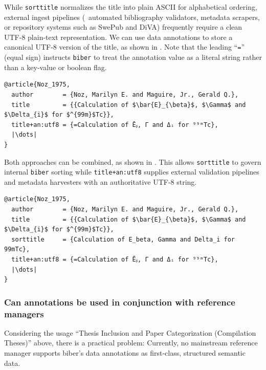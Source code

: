 \documentclass[12pt, twoside]{article}
\begin{document}
While \texttt{sorttitle} normalizes the title into plain ASCII for alphabetical ordering, external ingest pipelines (\eg\ automated bibliography validators, metadata scrapers, or repository systems such as SwePub and \gls{DiVA}) frequently require a clean UTF-8 plain-text representation. We can use \BibLaTeX{} data annotations to store a canonical UTF-8 version of the title, as shown in . Note that the leading \enquote{\texttt{=}} (equal sign) instructs \texttt{biber} to treat the annotation value as a literal string rather than a key-value or boolean flag.

\begin{listing}[!ht]
\begin{verbatim}
@article{Noz_1975,
  author        = {Noz, Marilyn E. and Maguire, Jr., Gerald Q.},
  title         = {{Calculation of $\bar{E}_{\beta}$, $\Gamma$ and $\Delta_{i}$ for $^{99m}$Tc}},
  title+an:utf8 = {=Calculation of Ēᵦ, Γ and Δᵢ for ⁹⁹ᵐTc},
  |\dots|
}
\end{verbatim}
\caption{Using data annotations to represent math in titles}
\label{lst:biberMathInTitles}
\end{listing}
\FloatBarrier

Both approaches can be combined, as shown in . This allows \texttt{sorttitle} to govern internal \texttt{biber} sorting while \texttt{title+an:utf8} supplies external validation pipelines and metadata harvesters with an authoritative UTF-8 string.

\begin{listing}[!ht]
\begin{verbatim}
@article{Noz_1975,
  author        = {Noz, Marilyn E. and Maguire, Jr., Gerald Q.},
  title         = {{Calculation of $\bar{E}_{\beta}$, $\Gamma$ and $\Delta_{i}$ for $^{99m}$Tc}},
  sorttitle     = {Calculation of E_beta, Gamma and Delta_i for 99mTc},
  title+an:utf8 = {=Calculation of Ēᵦ, Γ and Δᵢ for ⁹⁹ᵐTc},
  |\dots|
}
\end{verbatim}
\caption{Combining data annotations with sorttitle}
\label{lst:biberMathInTitlesCombined}
\end{listing}
\FloatBarrier

\subsubsection{Can annotations be used in conjunction with reference managers}
\label{sec:usingAnnotationsWithReferenceManagers}
Considering the usage \enquote{Thesis Inclusion and Paper Categorization (Compilation Theses)} above, there is a practical problem: 
Currently, no mainstream reference manager supports biber’s data annotations as first-class, structured semantic data.
\end{document}
